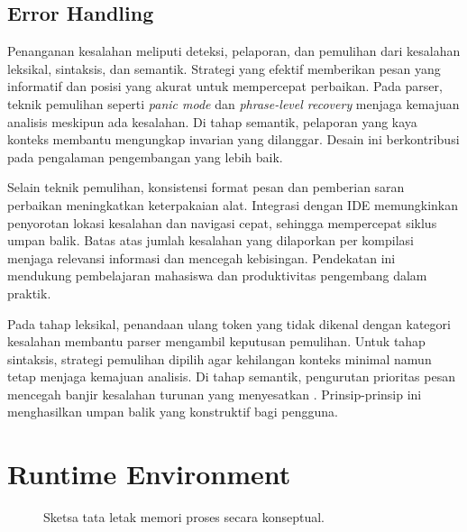 \documentclass[../main.tex]{subfiles}
\begin{document}
\subsection{Error Handling}
Penanganan kesalahan meliputi deteksi, pelaporan, dan pemulihan dari kesalahan leksikal, sintaksis, dan semantik. Strategi yang efektif memberikan pesan yang informatif dan posisi yang akurat untuk mempercepat perbaikan. Pada parser, teknik pemulihan seperti \emph{panic mode} dan \emph{phrase-level recovery} menjaga kemajuan analisis meskipun ada kesalahan. Di tahap semantik, pelaporan yang kaya konteks membantu mengungkap invarian yang dilanggar. Desain ini berkontribusi pada pengalaman pengembangan yang lebih baik.

Selain teknik pemulihan, konsistensi format pesan dan pemberian saran perbaikan meningkatkan keterpakaian alat. Integrasi dengan IDE memungkinkan penyorotan lokasi kesalahan dan navigasi cepat, sehingga mempercepat siklus umpan balik. Batas atas jumlah kesalahan yang dilaporkan per kompilasi menjaga relevansi informasi dan mencegah kebisingan. Pendekatan ini mendukung pembelajaran mahasiswa dan produktivitas pengembang dalam praktik.

Pada tahap leksikal, penandaan ulang token yang tidak dikenal dengan kategori kesalahan membantu parser mengambil keputusan pemulihan. Untuk tahap sintaksis, strategi pemulihan dipilih agar kehilangan konteks minimal namun tetap menjaga kemajuan analisis. Di tahap semantik, pengurutan prioritas pesan mencegah banjir kesalahan turunan yang menyesatkan \citep{Mogensen2010}. Prinsip-prinsip ini menghasilkan umpan balik yang konstruktif bagi pengguna.

\section{Runtime Environment}
\begin{figure}[t]
  \centering
  \caption{Sketsa tata letak memori proses secara konseptual.}
  \label{fig:memory-layout}
\end{figure}
\end{document}
